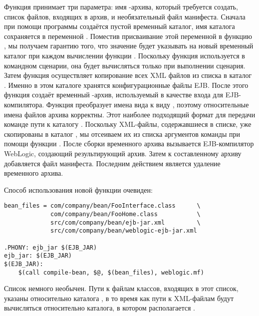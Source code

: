 Функция  принимает три параметра: имя
\Java{}\hyp{}архива, который требуется создать, список файлов,
входящих в архив, и необязательный файл манифеста. Сначала при помощи
программы  создаётся пустой временный каталог, имя
каталога сохраняется в переменной . Поместив
присваивание этой переменной в функцию , мы получаем
гарантию того, что значение  будет указывать
на новый временный каталог при каждом вычислении функции
. Поскольку функция
 используется в командном сценарии,
она будет вычисляться только при выполнении сценария. Затем функция
осуществляет копирование всех XML файлов из списка
 в каталог
. Именно в этом каталоге хранятся
конфигурационные файлы EJB. После этого функция создаёт временный
\Java{}\hyp{}архив, используемый в качестве входа для
EJB\hyp{}компилятора. Функция 
преобразует имена вида  к виду
, поэтому относительные имена файлов
архива корректны. Этот наиболее подходящий формат для передачи команде
 пути к каталогу . Поскольку
XML\hyp{}файлы, содержавшиеся в списке, уже скопированы в каталог
, мы отсеиваем их из списка аргументов команды
 при помощи функции . После
сборки временного архива вызывается EJB\hyp{}компилятор Web\-Lo\-gic,
создающий результирующий архив. Затем к составленному архиву
добавляется файл манифеста. Последним действием является удаление
временного архива.

Способ использования новой функции очевиден:

{\footnotesize
\begin{verbatim}
bean_files = com/company/bean/FooInterface.class      \
             com/company/bean/FooHome.class           \
             src/com/company/bean/ejb-jar.xml         \
             src/com/company/bean/weblogic-ejb-jar.xml

.PHONY: ejb_jar $(EJB_JAR)
ejb_jar: $(EJB_JAR)
$(EJB_JAR):
    $(call compile-bean, $@, $(bean_files), weblogic.mf)
\end{verbatim}
}

Список  немного необычен. Пути к файлам классов,
входящих в этот список, указаны относительно каталога
, в то время как пути к XML\hyp{}файлам будут
вычисляться относительно каталога, в котором располагается
\Makefile{}.

